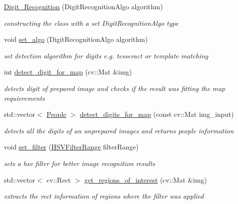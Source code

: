\begin{DoxyCompactItemize}
\item 
\mbox{\hyperlink{class_digit___recognition_a183d686f4f9f3ce1ed555e9311d30f56}{Digit\+\_\+\+Recognition}} (Digit\+Recognition\+Algo algorithm)
\begin{DoxyCompactList}\small\item\em constructing the class with a set Digit\+Recognition\+Algo type \end{DoxyCompactList}\item 
\mbox{\label{class_digit___recognition_a5c83d879c6881693c3606cc5a1bc8ef2}} 
void \mbox{\hyperlink{class_digit___recognition_a5c83d879c6881693c3606cc5a1bc8ef2}{set\+\_\+algo}} (Digit\+Recognition\+Algo algorithm)
\begin{DoxyCompactList}\small\item\em set detection algorithm for digits e.\+g. tesseract or template matching \end{DoxyCompactList}\item 
\mbox{\label{class_digit___recognition_a479e6126291463d9117abc6553c555df}} 
int \mbox{\hyperlink{class_digit___recognition_a479e6126291463d9117abc6553c555df}{detect\+\_\+digit\+\_\+for\+\_\+map}} (cv\+::\+Mat \&img)
\begin{DoxyCompactList}\small\item\em detects digit of prepared image and checks if the result was fitting the map requierements \end{DoxyCompactList}\item 
\mbox{\label{class_digit___recognition_a1de0bde8afbfc939d0ae32092fc6cee4}} 
std\+::vector$<$ \mbox{\hyperlink{class_people}{People}} $>$ \mbox{\hyperlink{class_digit___recognition_a1de0bde8afbfc939d0ae32092fc6cee4}{detect\+\_\+digits\+\_\+for\+\_\+map}} (const cv\+::\+Mat img\+\_\+input)
\begin{DoxyCompactList}\small\item\em detects all the digits of an unprepared images and returns people information \end{DoxyCompactList}\item 
void \mbox{\hyperlink{class_digit___recognition_a68484f6730ee2f0fc2050726c3ff2252}{set\+\_\+filter}} (\mbox{\hyperlink{struct_h_s_v_filter_range}{H\+S\+V\+Filter\+Range}} filter\+Range)
\begin{DoxyCompactList}\small\item\em sets a hsv filter for better image recognition results \end{DoxyCompactList}\item 
std\+::vector$<$ cv\+::\+Rect $>$ \mbox{\hyperlink{class_digit___recognition_acb87e2fb3a72d625170ab8c95ef6828f}{get\+\_\+regions\+\_\+of\+\_\+interest}} (cv\+::\+Mat \&img)
\begin{DoxyCompactList}\small\item\em extracts the rect information of regions where the filter was applied \end{DoxyCompactList}\end{DoxyCompactItemize}
